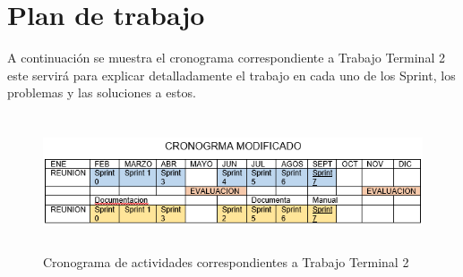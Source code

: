 	\section{Plan de trabajo}
	\noindent A continuación se muestra el cronograma correspondiente a Trabajo Terminal 2 este servirá para explicar detalladamente el trabajo en cada uno de los Sprint, los problemas y las soluciones a estos.
	\begin{figure}[hbt!]
		\centering
		\includegraphics[width=13cm, height=4cm]{Imagenes/cronograma}
		\caption{Cronograma de actividades correspondientes a Trabajo Terminal 2}
		\label{cronograma}
	\end{figure}

